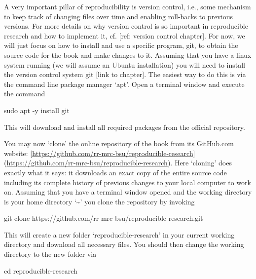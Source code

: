\documentclass[]{book}
\newenvironment{Shaded}{\begin{snugshade}}{\end{snugshade}}
\newcommand{\FunctionTok}[1]{\textcolor[rgb]{0.00,0.00,0.00}{#1}}
\newcommand{\BuiltInTok}[1]{#1}
\newcommand{\NormalTok}[1]{#1}
\begin{document}
A very important pillar of reproducibility is version control, i.e.,
some mechanism to keep track of changing files over time and enabling
roll-backs to previous versions. For more details on why version control
is so important in reproducible research and how to implement it, cf.
{[}ref: version control chapter{]}. For now, we will just focus on how
to install and use a specific program, git, to obtain the source code
for the book and make changes to it. Assuming that you have a linux
system running (we will assume an Ubuntu installation) you will need to
install the version control system git {[}link to chapter{]}. The
easiest way to do this is via the command line package manager `apt'.
Open a terminal window and execute the command

\begin{Shaded}
\begin{Highlighting}[]
\FunctionTok{sudo}\NormalTok{ apt -y install git}
\end{Highlighting}
\end{Shaded}

This will download and install all required packages from the official
repository.

You may now `clone' the online repository of the book from its
GitHub.com website:
{[}\url{https://github.com/rr-mrc-bsu/reproducible-research}{]}
(\url{https://github.com/rr-mrc-bsu/reproducible-research}). Here
`cloning' does exactly what it says: it downloads an exact copy of the
entire source code including its complete history of previous changes to
your local computer to work on. Assuming that you have a terminal window
opened and the working directory is your home directory
`\textasciitilde{}' you clone the repository by invoking

\begin{Shaded}
\begin{Highlighting}[]
\FunctionTok{git}\NormalTok{ clone https://github.com/rr-mrc-bsu/reproducible-research.git}
\end{Highlighting}
\end{Shaded}

This will create a new folder `reproducible-research' in your current
working directory and download all necessary files. You should then
change the working directory to the new folder via

\begin{Shaded}
\begin{Highlighting}[]
\BuiltInTok{cd}\NormalTok{ reproducible-research}
\end{Highlighting}
\end{Shaded}
\end{document}
